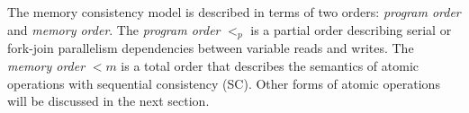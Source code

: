 %
%

The memory consistency model is described in terms of two orders: \textit{program order} and \textit{memory order}. The \textit{program order} $<_p$ is a partial order describing serial or fork-join parallelism dependencies between variable reads and writes. The \textit{memory order} $<m$ is a total order that describes the semantics of atomic operations with sequential consistency (SC). Other forms of atomic operations will be discussed in the next section.

